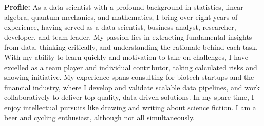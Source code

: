 
\vspace*{-2mm}
\begin{tcolorbox}[
        width=\textwidth,
        colback={gray!30},
        colframe=white,
        sharp corners,
        boxrule=0mm,
        arc=1mm,
    ]
    \begin{spacing}{1.2}
        \begin{multicols}{2}
            {\bf\large Profile:}
            As a data scientist with a profound background in statistics, linear algebra, quantum mechanics, and mathematics, I bring over eight years of experience, having served as a data scientist, business analyst, researcher, developer, and team leader. My passion lies in extracting fundamental insights from data, thinking critically, and understanding the rationale behind each task. With my ability to learn quickly and motivation to take on challenges, I have excelled as a team player and individual contributor, taking calculated risks and showing initiative. My experience spans consulting for biotech startups and the financial industry, where I develop and validate scalable data pipelines, and work collaboratively to deliver top-quality, data-driven solutions. In my spare time, I enjoy intellectual pursuits like drawing and writing about science fiction. I am a beer and cycling enthusiast, although not all simultaneously.

        \end{multicols}
    \end{spacing}
    \vspace*{-4mm}

\end{tcolorbox}
\vspace*{-6mm}